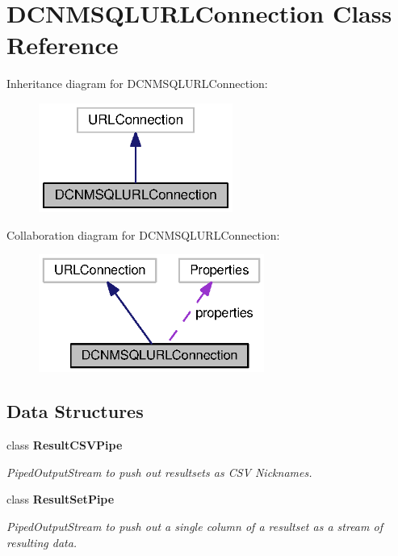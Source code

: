 \section{D\+C\+N\+M\+S\+Q\+L\+U\+R\+L\+Connection Class Reference}
\label{classorg_1_1smallfoot_1_1parser_1_1dcnmsql_1_1DCNMSQLURLConnection}


Inheritance diagram for D\+C\+N\+M\+S\+Q\+L\+U\+R\+L\+Connection\+:\nopagebreak
\begin{figure}[H]
\begin{center}
\leavevmode
\includegraphics[width=180pt]{classorg_1_1smallfoot_1_1parser_1_1dcnmsql_1_1DCNMSQLURLConnection__inherit__graph}
\end{center}
\end{figure}


Collaboration diagram for D\+C\+N\+M\+S\+Q\+L\+U\+R\+L\+Connection\+:\nopagebreak
\begin{figure}[H]
\begin{center}
\leavevmode
\includegraphics[width=209pt]{classorg_1_1smallfoot_1_1parser_1_1dcnmsql_1_1DCNMSQLURLConnection__coll__graph}
\end{center}
\end{figure}
\subsection*{Data Structures}
\begin{DoxyCompactItemize}
\item 
class {\bfseries Result\+C\+S\+V\+Pipe}
\begin{DoxyCompactList}\small\item\em Piped\+Output\+Stream to push out resultsets as C\+S\+V Nicknames. \end{DoxyCompactList}\item 
class {\bfseries Result\+Set\+Pipe}
\begin{DoxyCompactList}\small\item\em Piped\+Output\+Stream to push out a single column of a resultset as a stream of resulting data. \end{DoxyCompactList}\end{DoxyCompactItemize}
